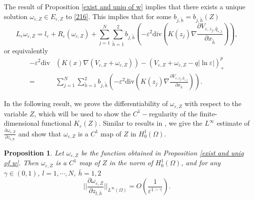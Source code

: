 \documentclass[12pt,reqno]{amsart}
\numberwithin{equation}{section}
\newtheorem{proposition}[theorem]{Proposition}
\theoremstyle{definition}
\theoremstyle{remark}
\newtheorem{remark}[theorem]{Remark}
\begin{document}

The result of Proposition \ref{exist and uniq of w} implies that there exists a unique solution $ \omega_{\varepsilon,Z}\in E_{\varepsilon,Z} $ to \eqref{216}. %
This implies that for some $ b_{j,\tilde{h}}=b_{j,\tilde{h}}(Z) $
\begin{equation}\label{5-000}
L_\varepsilon \omega_{\varepsilon,Z}= l_\varepsilon+  R_\varepsilon(\omega_{\varepsilon,Z})+\sum_{j=1}^N\sum_{\tilde{h}=1}^2b_{j,\tilde{h}}\left( -\varepsilon^2\text{div}\left (K(z_j)\nabla   \frac{\partial V_{\varepsilon, z_j, \hat{q}_{\varepsilon,j}}}{\partial x_{\tilde{h}}}\right )\right),
\end{equation}
or equivalently
\begin{equation}\label{5-00}
\begin{split}
-\varepsilon^2\text{div}&\left (K(x)\nabla (V_{\varepsilon,Z}+\omega_{\varepsilon,Z})\right )-\left (V_{\varepsilon,Z}+\omega_{\varepsilon,Z}-q|\ln\varepsilon|\right )^p_+\\
=&\sum_{j=1}^N\sum_{\tilde{h}=1}^2b_{j,\tilde{h}}\left( -\varepsilon^2\text{div}\left (K(z_j)\nabla   \frac{\partial V_{\varepsilon, z_j, \hat{q}_{\varepsilon,j}}}{\partial x_{\tilde{h}}}\right )\right).
\end{split}
\end{equation}

In the following result, we prove  the differentiability of $ \omega_{\varepsilon,Z}  $ with respect to the variable $ Z $, which will be used to show the $ C^1-$regularity of the finite-dimensional functional $ K_\varepsilon(Z) $. Similar to results in \cite{CPY,WYZ}, we give the $ L^\infty $ estimate of  $ \frac{\partial \omega_{\varepsilon,Z}}{\partial z_{i,\hbar}} $ and show that $ \omega_{\varepsilon,Z} $ is a $ C^1 $ map of $ Z $ in $ H^1_0 (\Omega) $.

\begin{proposition}\label{differ of w}
Let $ \omega_{\varepsilon,Z} $ be the function obtained in Proposition \ref{exist and uniq of w}. Then $ \omega_{\varepsilon,Z} $ is a $ C^1 $ map of $ Z $ in the
norm of $ H^1_0 (\Omega) $, and for any $ \gamma\in (0,1) $, $ l=1,\cdots,N $, $ \bar{h}=1,2 $
\begin{equation*}
\bigg|\bigg|\frac{\partial \omega_{\varepsilon,Z}}{\partial z_{l,\bar{h}}}\bigg|\bigg|_{L^\infty(\Omega)}=O\left (\frac{1}{\varepsilon^{1-\gamma}}\right ).
\end{equation*}

\end{proposition}
\end{document}
